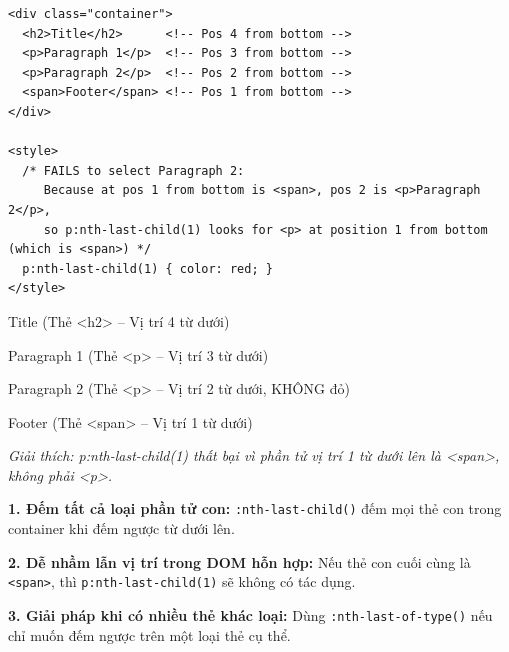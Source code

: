 \documentclass[11pt,oneside]{book}
\newcommand{\codeinline}[1]{\textcolor{accentOrange}{\texttt{#1}}}
\begin{document}
\begin{codeWindow}
\begin{lstlisting}[language=HTML5]
<div class="container">
  <h2>Title</h2>      <!-- Pos 4 from bottom -->
  <p>Paragraph 1</p>  <!-- Pos 3 from bottom -->
  <p>Paragraph 2</p>  <!-- Pos 2 from bottom -->
  <span>Footer</span> <!-- Pos 1 from bottom -->
</div>

<style>
  /* FAILS to select Paragraph 2:
     Because at pos 1 from bottom is <span>, pos 2 is <p>Paragraph 2</p>,
     so p:nth-last-child(1) looks for <p> at position 1 from bottom (which is <span>) */
  p:nth-last-child(1) { color: red; }
</style>
\end{lstlisting}
\end{codeWindow}

\begin{browserWindow}
\sffamily\small
Title {\scriptsize\textcolor{gray!60}{(Thẻ <h2> -- Vị trí 4 từ dưới)}} \par\vspace{2pt}
Paragraph 1 {\scriptsize\textcolor{gray!60}{(Thẻ <p> -- Vị trí 3 từ dưới)}} \par\vspace{2pt}
Paragraph 2 {\scriptsize\textcolor{gray!60}{(Thẻ <p> -- Vị trí 2 từ dưới, KHÔNG đỏ)}} \par\vspace{2pt}
Footer {\scriptsize\textcolor{gray!60}{(Thẻ <span> -- Vị trí 1 từ dưới)}} \par\vspace{4pt}
{\scriptsize\textcolor{gray!60}{\textit{Giải thích: p:nth-last-child(1) thất bại vì phần tử vị trí 1 từ dưới lên là <span>, không phải <p>.}}}
\end{browserWindow}

\begin{warnBox}
\textbf{1. Đếm tất cả loại phần tử con:} \codeinline{:nth-last-child()} đếm mọi thẻ con trong container khi đếm ngược từ dưới lên.
\par\vspace{4pt}
\textbf{2. Dễ nhầm lẫn vị trí trong DOM hỗn hợp:} Nếu thẻ con cuối cùng là \codeinline{<span>}, thì \codeinline{p:nth-last-child(1)} sẽ không có tác dụng.
\par\vspace{4pt}
\textbf{3. Giải pháp khi có nhiều thẻ khác loại:} Dùng \codeinline{:nth-last-of-type()} nếu chỉ muốn đếm ngược trên một loại thẻ cụ thể.
\end{warnBox}
\end{document}
